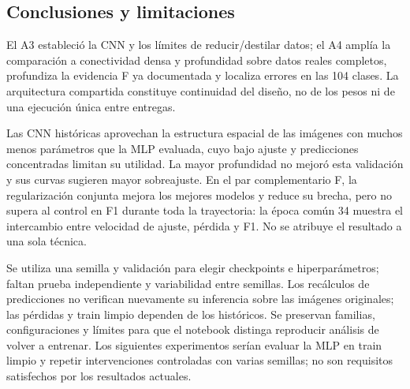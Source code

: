 \subsection{Conclusiones y limitaciones}
El A3 estableció la CNN y los límites de reducir/destilar datos; el A4 amplía
la comparación a conectividad densa y profundidad sobre datos reales completos,
profundiza la evidencia F ya documentada y localiza errores en las 104 clases.
La arquitectura compartida constituye continuidad del diseño, no de los pesos
ni de una ejecución única entre entregas.

Las CNN históricas aprovechan la estructura espacial de las imágenes con muchos
menos parámetros que la MLP evaluada, cuyo bajo ajuste y predicciones concentradas
limitan su utilidad. La mayor profundidad no mejoró esta validación y sus curvas
sugieren mayor sobreajuste. En el par complementario F, la regularización conjunta
mejora los mejores modelos y reduce su brecha, pero no supera al control en
F1 durante toda la trayectoria: la época común 34 muestra el intercambio entre
velocidad de ajuste, pérdida y F1. No se atribuye el resultado a una sola técnica.

Se utiliza una semilla y validación para elegir checkpoints e hiperparámetros;
faltan prueba independiente y variabilidad entre semillas. Los recálculos de
predicciones no verifican nuevamente su inferencia sobre las imágenes originales;
las pérdidas y train limpio dependen de los históricos. Se preservan familias,
configuraciones y límites para que el notebook distinga reproducir análisis de
volver a entrenar. Los siguientes experimentos serían evaluar la MLP en train
limpio y repetir intervenciones controladas con varias semillas; no son
requisitos satisfechos por los resultados actuales.
